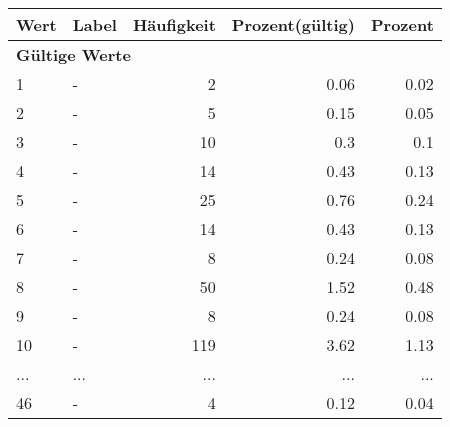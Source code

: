      \begin{longtable}{lXrrr}
     \toprule
     \textbf{Wert} & \textbf{Label} & \textbf{Häufigkeit} & \textbf{Prozent(gültig)} & \textbf{Prozent} \\
     \endhead
     \midrule
     \multicolumn{5}{l}{\textbf{Gültige Werte}}\\
        1 & \multicolumn{1}{X}{-} & %
          \num{2} &
          \num[round-mode=places,round-precision=2]{0,06} &
          \num[round-mode=places,round-precision=2]{0,02} \\
        2 & \multicolumn{1}{X}{-} & %
          \num{5} &
          \num[round-mode=places,round-precision=2]{0,15} &
          \num[round-mode=places,round-precision=2]{0,05} \\
        3 & \multicolumn{1}{X}{-} & %
          \num{10} &
          \num[round-mode=places,round-precision=2]{0,3} &
          \num[round-mode=places,round-precision=2]{0,1} \\
        4 & \multicolumn{1}{X}{-} & %
          \num{14} &
          \num[round-mode=places,round-precision=2]{0,43} &
          \num[round-mode=places,round-precision=2]{0,13} \\
        5 & \multicolumn{1}{X}{-} & %
          \num{25} &
          \num[round-mode=places,round-precision=2]{0,76} &
          \num[round-mode=places,round-precision=2]{0,24} \\
        6 & \multicolumn{1}{X}{-} & %
          \num{14} &
          \num[round-mode=places,round-precision=2]{0,43} &
          \num[round-mode=places,round-precision=2]{0,13} \\
        7 & \multicolumn{1}{X}{-} & %
          \num{8} &
          \num[round-mode=places,round-precision=2]{0,24} &
          \num[round-mode=places,round-precision=2]{0,08} \\
        8 & \multicolumn{1}{X}{-} & %
          \num{50} &
          \num[round-mode=places,round-precision=2]{1,52} &
          \num[round-mode=places,round-precision=2]{0,48} \\
        9 & \multicolumn{1}{X}{-} & %
          \num{8} &
          \num[round-mode=places,round-precision=2]{0,24} &
          \num[round-mode=places,round-precision=2]{0,08} \\
        10 & \multicolumn{1}{X}{-} & %
          \num{119} &
          \num[round-mode=places,round-precision=2]{3,62} &
          \num[round-mode=places,round-precision=2]{1,13} \\
       ... & ... & ... & ... & ... \\
        46 & \multicolumn{1}{X}{-} & %
          \num{4} &
          \num[round-mode=places,round-precision=2]{0,12} &
          \num[round-mode=places,round-precision=2]{0,04} \\


\end{longtable}
